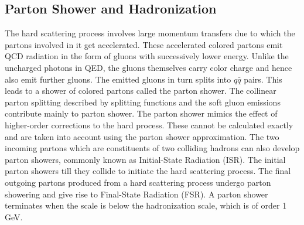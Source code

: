 \subsection{Parton Shower and Hadronization}
The hard scattering process involves large momentum transfers due to which the partons involved in it get accelerated. These accelerated colored partons emit QCD radiation in the form of gluons with successively lower energy. Unlike the uncharged photons in QED, the gluons themselves carry color charge and hence also emit further gluons. The emitted gluons in turn splits into $q\bar{q}$ pairs. This leads to a shower of colored partons called the parton shower. The collinear parton splitting described by splitting functions and the soft gluon emissions contribute mainly to parton shower. The parton shower mimics the effect of higher-order corrections to the hard process. These cannot be calculated exactly and are taken into account using the parton shower approximation. The two incoming partons which are constituents of two colliding hadrons can also develop parton showers, commonly known as Initial-State Radiation (ISR). The initial parton showers till they collide to initiate the hard scattering process. The final outgoing partons produced from a hard scattering process undergo parton showering and give rise to Final-State Radiation (FSR). A parton shower terminates when the scale is below the hadronization scale, which is of order 1 GeV.


